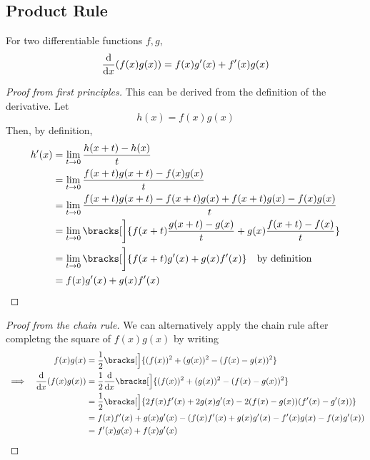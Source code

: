 \subsection{Product Rule} \label{sec_calc_product}

\begin{theorem}
    For two differentiable functions \(f, g\),
    \begin{equation*}
        \dv{x} (f(x)g(x)) = f(x)g'(x) + f'(x)g(x)
    \end{equation*}
\end{theorem}
\begin{proof}[Proof from first principles]
    This can be derived from the definition of the derivative. Let
    \begin{equation*}
        h(x) = f(x)g(x)
    \end{equation*}
    Then, by definition,
    \begin{align*}
        h'(x) &= \lim_{t \to 0} \frac{h(x + t) - h(x)} t \\
              &= \lim_{t \to 0} \frac{f(x + t)g(x + t) - f(x)g(x)} t \\
              &= \lim_{t \to 0} \frac{f(x + t)g(x + t) - f(x + t)g(x)
                                    + f(x + t)g(x) - f(x)g(x)} t \\
              &= \lim_{t \to 0} \bracks[\bigg]{
                  f(x + t) \frac{g(x + t) - g(x)} t
                + g(x) \frac{f(x + t) - f(x)} t} \\
              &= \lim_{t \to 0} \bracks[\bigg]{
                  f(x + t)g'(x)
                + g(x) f'(x)} \quad \text{by definition} \\
              &= f(x)g'(x) + g(x)f'(x)
        \qedhere
    \end{align*}
\end{proof}
\begin{proof}[Proof from the chain rule]
    We can alternatively apply the chain rule after completng the square of
    \(f(x)g(x)\) by writing
    \begin{alignat*}{2}
        && f(x)g(x) &= \frac 12 \bracks[\Big]
                        {(f(x))^2 + (g(x))^2 - (f(x) - g(x))^2} \\
        &\implies& \dv{x} (f(x)g(x))
                    &= \frac 12 \dv{x} \bracks[\Big]
                        {(f(x))^2 + (g(x))^2 - (f(x) - g(x))^2} \\
        &&          &= \frac 12 \bracks[\Big]
                        {2f(x)f'(x) + 2g(x)g'(x)
                       - 2(f(x) - g(x))(f'(x) - g'(x))} \\
        &&          &= f(x)f'(x) + g(x)g'(x)
                     - (f(x)f'(x) + g(x)g'(x) - f'(x)g(x) - f(x)g'(x)) \\
        &&          &= f'(x)g(x) + f(x)g'(x) \qedhere
    \end{alignat*}
\end{proof}
